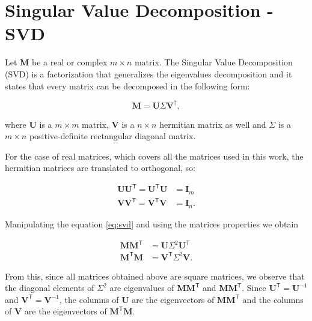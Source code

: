 \appendix

\chapter{Singular Value Decomposition - SVD}\label{appendix:svd}

Let $\mathbf{M}$ be a real or complex $m \times n$ matrix. The Singular Value Decomposition (SVD) is a factorization that generalizes the eigenvalues decomposition and it states that every matrix can be decomposed in the following form:

\begin{equation}
    \mathbf{M} = \mathbf{U} \Sigma \mathbf{V}^{\dagger},
    \label{eq:svd}
\end{equation}

where $\mathbf{U}$ is a $m \times m$ matrix, $\mathbf{V}$ is a $n \times n$ hermitian matrix as well and $\Sigma$ is a $m \times n$ positive-definite rectangular diagonal matrix. 

For the case of real matrices, which covers all the matrices used in this work, the hermitian matrices are translated to orthogonal, so:

\begin{align}
    \mathbf{U}\mathbf{U}^{\mathsf{T}} = \mathbf{U}^{\mathsf{T}}\mathbf{U} &= \mathbf{I}_{m} \\
    \mathbf{V}\mathbf{V}^{\mathsf{T}} = \mathbf{V}^{\mathsf{T}}\mathbf{V} &= \mathbf{I}_{n}. 
\end{align}

Manipulating the equation \eqref{eq:svd} and using the matrices properties we obtain

\begin{align}
    \mathbf{M}\mathbf{M}^{\mathsf{T}} &= \mathbf{U} \Sigma^2 \mathbf{U}^{\mathsf{T}} \\
    \mathbf{M}^{\mathsf{T}}\mathbf{M} &= \mathbf{V}^{\mathsf{T}} \Sigma^2 \mathbf{V}.
\end{align}

From this, since all matrices obtained above are square matrices, we observe that the diagonal elements of $\Sigma^2$ are eigenvalues of $\mathbf{M}\mathbf{M}^{\mathsf{T}}$ and $\mathbf{M}\mathbf{M}^{\mathsf{T}}$. Since $\mathbf{U}^{\mathsf{T}} = \mathbf{U}^{-1}$ and $\mathbf{V}^{\mathsf{T}} = \mathbf{V}^{-1}$, the columns of $\mathbf{U}$ are the eigenvectors of $\mathbf{M}\mathbf{M}^{\mathsf{T}}$ and the columns of $\mathbf{V}$ are the eigenvectors of $\mathbf{M}^{\mathsf{T}}\mathbf{M}$.

